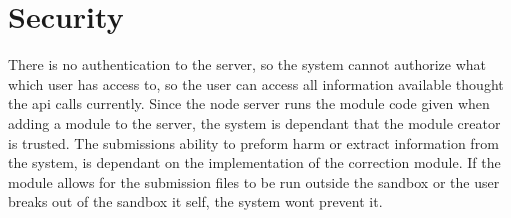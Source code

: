 \chapter{Security}
There is no authentication to the server, so the system cannot authorize what which user has access to, so the user can access all information available thought the api calls currently. Since the node server runs the module code given when adding a module to the server, the system is dependant that the module creator is trusted. The submissions ability to preform harm or extract information from the system, is dependant on the implementation of the correction module. If the module allows for the submission files to be run outside the sandbox or the user breaks out of the sandbox it self, the system wont prevent it.
